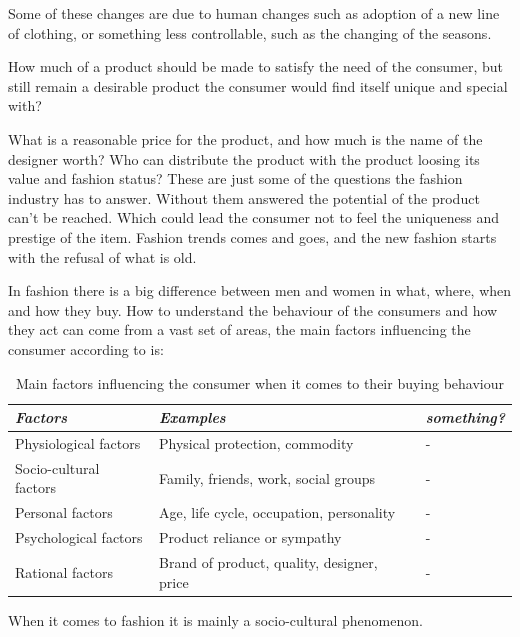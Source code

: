 Some of these changes are due to human changes such as adoption of a new line
of clothing, or something less controllable, such as the changing of the
seasons.

How much of a product should be made to satisfy the need of the consumer, but
still remain a desirable product the consumer would find itself unique and
special with?

What is a reasonable price for the product, and how much is the name of the
designer worth?  Who can distribute the product with the product loosing its
value and fashion status?  These are just some of the questions the fashion
industry has to answer.  Without them answered the potential of the product
can't be reached.  Which could lead the consumer not to feel the uniqueness and
prestige of the item.  Fashion trends comes and goes, and the new fashion
starts with the refusal of what is old.


In fashion there is a big difference between men and women in what, where, when
and how they buy.  How to understand the behaviour of the consumers and how they
act can come from a vast set of areas, the main factors influencing the
consumer according to \cite{kotler2009marketing} is:

\begin{table}[H]
    \centering
    \begin{tabular}{l|l|l}
      \emph{Factors}        & \emph{Examples} & \emph{something?} \\ \hline
      Physiological factors   & Physical protection, commodity & - \\ \hline
      Socio-cultural factors  & Family, friends, work, social groups & - \\ \hline
      Personal factors        & Age, life cycle, occupation, personality & - \\ \hline
      Psychological factors   & Product reliance or sympathy & - \\ \hline %
      Rational factors        & Brand of product, quality, designer, price & - \\
    \end{tabular}
    \caption[Fashion Factors]{Main factors influencing the consumer when it comes to their buying behaviour}
    \label{table:FashionFactors}
\end{table}
When it comes to fashion it is mainly a socio-cultural phenomenon.

